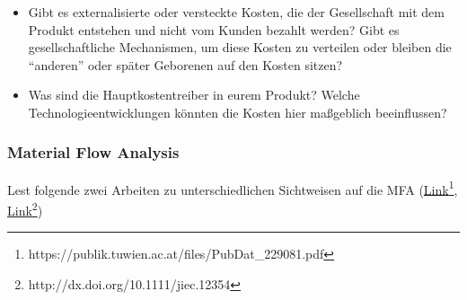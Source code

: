 \documentclass[headinclude=true]{scrartcl}
\begin{document}
\begin{itemize}
	\item Gibt es externalisierte oder versteckte Kosten, die der Gesellschaft mit dem Produkt entstehen und nicht vom Kunden bezahlt werden? Gibt es gesellschaftliche Mechanismen, um diese Kosten zu verteilen oder bleiben die "`anderen"' oder später Geborenen auf den Kosten sitzen?
	\item Was sind die Hauptkostentreiber in eurem Produkt? Welche Technologieentwicklungen könnten die Kosten hier maßgeblich beeinflussen?
\end{itemize}


\subsubsection{Material Flow Analysis}

Lest folgende zwei Arbeiten zu unterschiedlichen Sichtweisen auf die MFA (\href{https://publik.tuwien.ac.at/files/PubDat_229081.pdf}{Link\footnote{\url{https://publik.tuwien.ac.at/files/PubDat_229081.pdf}}}, \href{http://dx.doi.org/10.1111/jiec.12354}{Link\footnote{\url{http://dx.doi.org/10.1111/jiec.12354}}})
\end{document}
